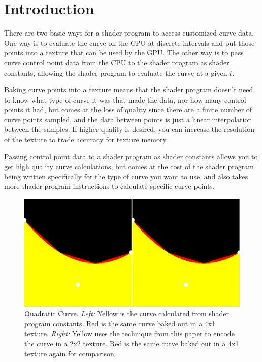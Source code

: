 \documentclass{jcgt}
\begin{document}
\section{Introduction}
\label{sec:introduction}
There are two basic ways for a shader program to access customized curve data.  One way is to evaluate the curve on the CPU at discrete intervals and put those points into a texture that can be used by the GPU.  The other way is to pass curve control point data from the CPU to the shader program as shader constants, allowing the shader program to evaluate the curve at a given $t$.

Baking curve points into a texture means that the shader program doesn't need to know what type of curve it was that made the data, nor how many control points it had, but comes at the loss of quality since there are a finite number of curve points sampled, and the data between points is just a linear interpolation between the samples.  If higher quality is desired, you can increase the resolution of the texture to trade accuracy for texture memory.

Passing control point data to a shader program as shader constants allows you to get high quality curve calculations, but comes at the cost of the shader program being written specifically for the type of curve you want to use, and also takes more shader program instructions to calculate specific curve points.

\begin{figure}
  \includegraphics[width=5in]{Figure2.png}
  \caption{Quadratic Curve.  \textit{Left:} Yellow is the curve calculated from shader program constants.  Red is the same curve baked out in a 4x1 texture.  \textit{Right:}  Yellow uses the technique from this paper to encode the curve in a 2x2 texture.  Red is the same curve baked out in a 4x1 texture again for comparison.}
  \label{fig:quickcomparison}
\end{figure}
\end{document}
